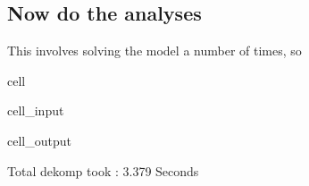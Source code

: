 \documentclass[letterpaper,10pt,english]{jupyterBook}
\begin{document}
\subsection{Now do the analyses}
\label{\detokenize{content/06_ModelAnalytics/Attribution:now-do-the-analyses}}
\sphinxAtStartPar
This involves solving the model a number of times, so

\begin{sphinxuseclass}{cell}\begin{sphinxVerbatimInput}

\begin{sphinxuseclass}{cell_input}
\begin{sphinxVerbatim}[commandchars=\\\{\}]
   
\end{sphinxVerbatim}

\end{sphinxuseclass}\end{sphinxVerbatimInput}
\begin{sphinxVerbatimOutput}

\begin{sphinxuseclass}{cell_output}
\begin{sphinxVerbatim}[commandchars=\\\{\}]
Total dekomp took       :         3.379 Seconds
\end{sphinxVerbatim}

\end{sphinxuseclass}\end{sphinxVerbatimOutput}

\end{sphinxuseclass}
\end{document}

